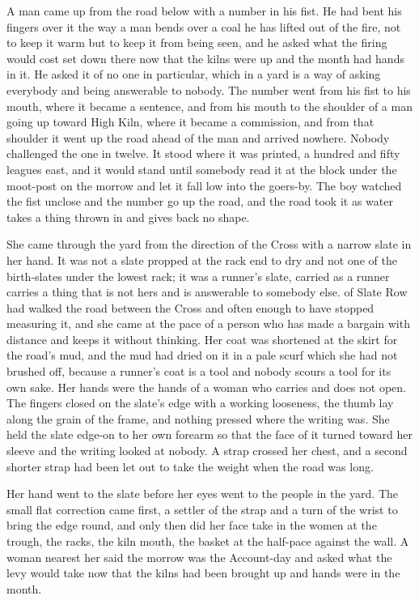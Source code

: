 A man came up from the road below  with a number in his fist. He had bent his fingers over it the way a man bends over a coal he has lifted out of the fire, not to keep it warm but to keep it from being seen, and he asked what the firing would cost set down there now that the kilns were up and the month had hands in it. He asked it of no one in particular, which in a yard is a way of asking everybody and being answerable to nobody. The number went from his fist to his mouth, where it became a sentence, and from his mouth to the shoulder of a man going up toward High Kiln, where it became a commission, and from that shoulder it went up the road ahead of the man and arrived nowhere. Nobody challenged the one in twelve. It stood where it was printed, a hundred and fifty leagues east, and it would stand until somebody read it at the block under the moot-post on the morrow and let it fall low into the goers-by. The boy watched the fist unclose and the number go up the road, and the road took it as water takes a thing thrown in and gives back no shape.

\scenebreak

She came through the yard from the direction of the Cross with a narrow slate in her hand. It was not a slate propped at the rack end to dry and not one of the birth-slates under the lowest rack; it was a runner's slate, carried as a runner carries a thing that is not hers and is answerable to somebody else.  of Slate Row had walked the road between the Cross and  often enough to have stopped measuring it, and she came at the pace of a person who has made a bargain with distance and keeps it without thinking. Her coat was shortened at the skirt for the road's mud, and the mud had dried on it in a pale scurf which she had not brushed off, because a runner's coat is a tool and nobody scours a tool for its own sake. Her hands were the hands of a woman who carries and does not open. The fingers closed on the slate's edge with a working looseness, the thumb lay along the grain of the frame, and nothing pressed where the writing was. She held the slate edge-on to her own forearm so that the face of it turned toward her sleeve and the writing looked at nobody. A strap crossed her chest, and a second shorter strap had been let out to take the weight when the road was long.

Her hand went to the slate before her eyes went to the people in the yard. The small flat correction came first, a settler of the strap and a turn of the wrist to bring the edge round, and only then did her face take in the women at the trough, the racks, the kiln mouth, the basket at the half-pace against the wall. A woman nearest her said the morrow was the Account-day and asked what the levy would take now that the kilns had been brought up and hands were in the month.

